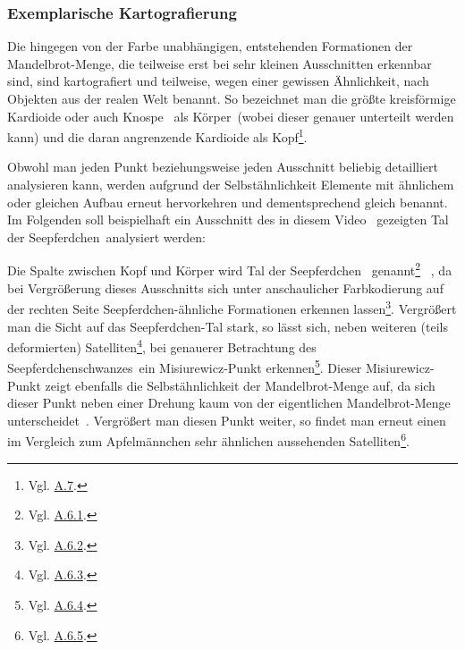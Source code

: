 \subsubsection{Exemplarische Kartografierung}

Die hingegen von der Farbe unabhängigen, entstehenden Formationen der
Mandelbrot-Menge, die teilweise erst bei sehr kleinen Ausschnitten erkennbar sind,
sind kartografiert und teilweise, wegen einer gewissen Ähnlichkeit, nach
Objekten aus der realen Welt benannt.
So bezeichnet man die größte kreisförmige Kardioide oder auch \glqq Knospe\grqq
~als \glqq Körper\grqq~(wobei dieser genauer unterteilt werden kann)
und die daran angrenzende Kardioide als
\glqq Kopf\grqq\footnote{Vgl. \hyperref[app:7]{A.7}.}.

Obwohl man jeden Punkt beziehungsweise jeden Ausschnitt beliebig detailliert
analysieren kann, werden aufgrund der Selbstähnlichkeit Elemente mit ähnlichem
oder gleichen Aufbau erneut hervorkehren und dementsprechend gleich benannt.
Im Folgenden soll beispielhaft ein Ausschnitt des in diesem
Video~\cite{beyer_zoomfahrt_2017} gezeigten
\glqq Tal der Seepferdchen\grqq~analysiert werden:

Die Spalte zwischen Kopf und Körper wird \glqq Tal der Seepferdchen\grqq
~genannt\footnote{Vgl. \hyperref[app:6.1]{A.6.1}.}
~\cite{robert_p_seahorse_2010}, da bei Vergrößerung dieses Ausschnitts
sich unter anschaulicher Farbkodierung auf der rechten Seite
Seepferdchen-ähnliche Formationen erkennen lassen\footnote{Vgl. \hyperref[app:6.2]{A.6.2}.}.
Vergrößert man die Sicht auf das Seepferdchen-Tal stark, so lässt sich,
neben weiteren (teils deformierten) Satelliten\footnote{Vgl. \hyperref[app:6.3]{A.6.3}.},
bei genauerer Betrachtung des \glqq Seepferdchenschwanzes\grqq~ein
Misiurewicz-Punkt erkennen\footnote{Vgl. \hyperref[app:6.4]{A.6.4}.}.
Dieser Misiurewicz-Punkt zeigt ebenfalls die Selbstähnlichkeit der Mandelbrot-Menge auf,
da sich dieser Punkt neben einer Drehung kaum von der eigentlichen
Mandelbrot-Menge unterscheidet~\cite{lei_similarity_1989}.
Vergrößert man diesen Punkt weiter, so findet man erneut einen im Vergleich
zum Apfelmännchen sehr ähnlichen aussehenden
Satelliten\footnote{Vgl. \hyperref[app:6.5]{A.6.5}.}.